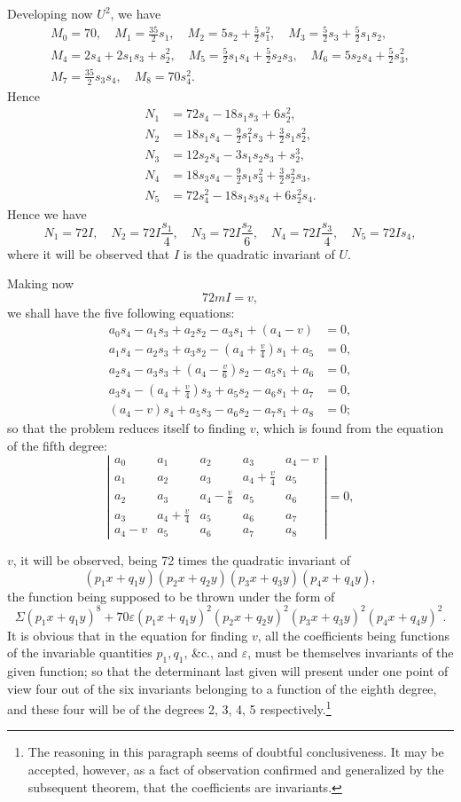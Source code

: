 \documentclass[11pt]{article}
\newcommand{\sourcepage}[1]{\marginpar{\scriptsize p.~#1}}
\begin{document}
\sourcepage{272}
Developing now $U^2$, we have
\[
\begin{gathered}
M_0=70,\quad M_1=\frac{35}{2}s_1,\quad
M_2=5s_2+\frac52s_1^2,\quad
M_3=\frac52s_3+\frac52s_1s_2,\\
M_4=2s_4+2s_1s_3+s_2^2,\quad
M_5=\frac52s_1s_4+\frac52s_2s_3,\quad
M_6=5s_2s_4+\frac52s_3^2,\\
M_7=\frac{35}{2}s_3s_4,\quad M_8=70s_4^2.
\end{gathered}
\]
Hence
\[
\begin{aligned}
N_1&=72s_4-18s_1s_3+6s_2^2,\\
N_2&=18s_1s_4-\frac92s_1^2s_3+\frac32s_1s_2^2,\\
N_3&=12s_2s_4-3s_1s_2s_3+s_2^3,\\
N_4&=18s_3s_4-\frac92s_1s_3^2+\frac32s_2^2s_3,\\
N_5&=72s_4^2-18s_1s_3s_4+6s_2^2s_4.
\end{aligned}
\]
Hence we have
\[
N_1=72I,\quad N_2=72I\frac{s_1}{4},\quad N_3=72I\frac{s_2}{6},\quad N_4=72I\frac{s_3}{4},\quad N_5=72Is_4,
\]
where it will be observed that $I$ is the quadratic invariant of $U$.

Making now
\[
72mI=v,
\]
we shall have the five following equations:
\[
\begin{aligned}
a_0s_4-a_1s_3+a_2s_2-a_3s_1+(a_4-v)&=0,\\
a_1s_4-a_2s_3+a_3s_2-\left(a_4+\frac{v}{4}\right)s_1+a_5&=0,\\
a_2s_4-a_3s_3+\left(a_4-\frac{v}{6}\right)s_2-a_5s_1+a_6&=0,\\
a_3s_4-\left(a_4+\frac{v}{4}\right)s_3+a_5s_2-a_6s_1+a_7&=0,\\
(a_4-v)s_4+a_5s_3-a_6s_2-a_7s_1+a_8&=0;
\end{aligned}
\]
so that the problem reduces itself to finding $v$, which is found from the equation of the fifth degree:
\[
\left|\begin{array}{ccccc}
a_0&a_1&a_2&a_3&a_4-v\\
a_1&a_2&a_3&a_4+\frac{v}{4}&a_5\\
a_2&a_3&a_4-\frac{v}{6}&a_5&a_6\\
a_3&a_4+\frac{v}{4}&a_5&a_6&a_7\\
a_4-v&a_5&a_6&a_7&a_8
\end{array}\right|=0,
\]

\sourcepage{273}
$v$, it will be observed, being 72 times the quadratic invariant of
\[
(p_1x+q_1y)(p_2x+q_2y)(p_3x+q_3y)(p_4x+q_4y),
\]
the function being supposed to be thrown under the form of
\[
\Sigma(p_1x+q_1y)^8+70\varepsilon(p_1x+q_1y)^2(p_2x+q_2y)^2(p_3x+q_3y)^2(p_4x+q_4y)^2.
\]
It is obvious that in the equation for finding $v$, all the coefficients being functions of the invariable quantities $p_1,q_1$, \&c., and $\varepsilon$, must be themselves invariants of the given function; so that the determinant last given will present under one point of view four out of the six invariants belonging to a function of the eighth degree, and these four will be of the degrees 2, 3, 4, 5 respectively.\footnote{The reasoning in this paragraph seems of doubtful conclusiveness. It may be accepted, however, as a fact of observation confirmed and generalized by the subsequent theorem, that the coefficients are invariants.}
\end{document}
